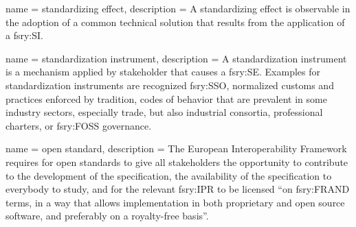  { name = {standardizing effect}, description = {
    A standardizing effect is observable in the adoption of a common
    technical solution that results from the application of a
    \gls{fsry:SI}.} }

 { name = {standardization instrument},
  description = { A standardization instrument is a mechanism applied
    by stakeholder that causes a \gls{fsry:SE}. Examples for
    standardization instruments are recognized \gls{fsry:SSO}, normalized
    customs and practices enforced by tradition, codes of behavior
    that are prevalent in some industry sectors, especially trade, but
    also industrial consortia, professional charters, or \gls{fsry:FOSS}
    governance.} }

 { name = {open standard}, description = {
    The European Interoperability Framework requires for open
    standards to give all stakeholders the opportunity to contribute
    to the development of the specification, the availability of the
    specification to everybody to study, and for the relevant
    \gls{fsry:IPR} to be licensed ``on \gls{fsry:FRAND} terms, in a way that
    allows implementation in both proprietary and open source
    software, and preferably on a royalty-free
    basis''.\cite{flossary:ec-sep-2018} } }
